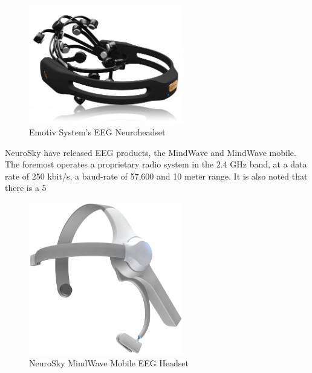 \documentclass[]{article}
\begin{document}
\begin{figure}[htb]
	\begin{center}
		\includegraphics[width = 0.6\textwidth]{emotive}
	\end{center}
	\caption{Emotiv System's \ac{EEG} Neuroheadset}
	\label{fig:emotive}
\end{figure}

NeuroSky have released \ac{EEG} products, the MindWave and MindWave mobile. The foremost operates a proprietary radio system in the 2.4 GHz band, at a data rate of 250 kbit/s, a baud-rate of 57,600 and 10 meter range. It is also noted that there is a 5%

\begin{figure}[H]
	\begin{center}
		\includegraphics[width = 0.6\textwidth]{neurosky}
	\end{center}
	\caption{NeuroSky MindWave Mobile \ac{EEG}  Headset}
	\label{fig:neurosky}
\end{figure}
\end{document}
